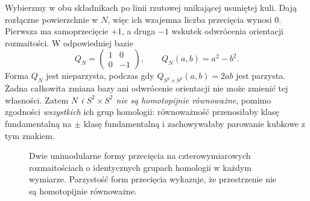 \begin{przyklad}
Wybierzmy w obu składnikach po linii
rzutowej unikającej usuniętej kuli.
Dają rozłączne powierzchnie w $N$,
więc ich wzajemna liczba przecięcia wynosi $0$.
Pierwsza ma samoprzecięcie $+1$,
a druga $-1$ wskutek odwrócenia
orientacji rozmaitości. W odpowiedniej bazie
\[
 Q_N=\begin{pmatrix}1&0\\0&-1\end{pmatrix},
 \qquad Q_N(a,b)=a^2-b^2.
\]
Forma $Q_N$ jest nieparzysta,
podczas gdy $Q_{S^2\times S^2}(a,b)=2ab$
jest parzysta. Żadna całkowita zmiana bazy
ani odwrócenie orientacji nie może
zmienić tej własności. Zatem
\emph{$N$ i $S^2\times S^2$ nie są
homotopijnie równoważne}, pomimo zgodności
\emph{wszystkich} ich grup homologii:
równoważność przenosiłaby klasę fundamentalną
na $\pm$ klasę fundamentalną i
zachowywałaby parowanie kubkowe z tym znakiem.
\end{przyklad}

\begin{figure}[!htbp]
\centering
{}
\caption{Dwie unimodularne formy przecięcia na
czterowymiarowych rozmaitościach o identycznych grupach
homologii w każdym wymiarze. Parzystość form przecięcia
wykazuje, że przestrzenie nie są homotopijnie równoważne.}
\label{fig:formy-przeciecia-parzystosc}
\end{figure}

